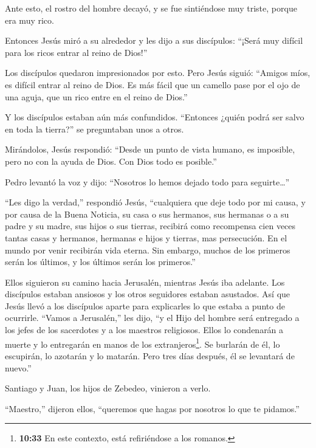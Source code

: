  Ante esto, el rostro del hombre decayó, y se fue
sintiéndose muy triste, porque era muy rico.

 Entonces Jesús miró a su alrededor y les dijo a sus
discípulos: ``¡Será muy difícil para los ricos entrar al reino de
Dios!''

 Los discípulos quedaron impresionados por esto. Pero Jesús
siguió: ``Amigos míos, es difícil entrar al reino de Dios. 
Es más fácil que un camello pase por el ojo de una aguja, que un rico
entre en el reino de Dios.''

 Y los discípulos estaban aún más confundidos. ``Entonces
¿quién podrá ser salvo en toda la tierra?'' se preguntaban unos a otros.

 Mirándolos, Jesús respondió: ``Desde un punto de vista
humano, es imposible, pero no con la ayuda de Dios. Con Dios todo es
posible.''

 Pedro levantó la voz y dijo: ``Nosotros lo hemos dejado
todo para seguirte\ldots{}''

 ``Les digo la verdad,'' respondió Jesús, ``cualquiera que
deje todo por mi causa, y por causa de la Buena Noticia, su casa o sus
hermanos, sus hermanas o a su padre y su madre, sus hijos o sus tierras,
 recibirá como recompensa cien veces tantas casas y
hermanos, hermanas e hijos y tierras, mas persecución. En el mundo por
venir recibirán vida eterna.  Sin embargo, muchos de los
primeros serán los últimos, y los últimos serán los primeros.''

 Ellos siguieron su camino hacia Jerusalén, mientras Jesús
iba adelante. Los discípulos estaban ansiosos y los otros seguidores
estaban asustados. Así que Jesús llevó a los discípulos aparte para
explicarles lo que estaba a punto de ocurrirle.  ``Vamos a
Jerusalén,'' les dijo, ``y el Hijo del hombre será entregado a los jefes
de los sacerdotes y a los maestros religiosos. Ellos lo condenarán a
muerte y lo entregarán en manos de los extranjeros\footnote{\textbf{10:33}
  En este contexto, está refiriéndose a los romanos.}.  Se
burlarán de él, lo escupirán, lo azotarán y lo matarán. Pero tres días
después, él se levantará de nuevo.''

 Santiago y Juan, los hijos de Zebedeo, vinieron a verlo.

``Maestro,'' dijeron ellos, ``queremos que hagas por nosotros lo que te
pidamos.''

